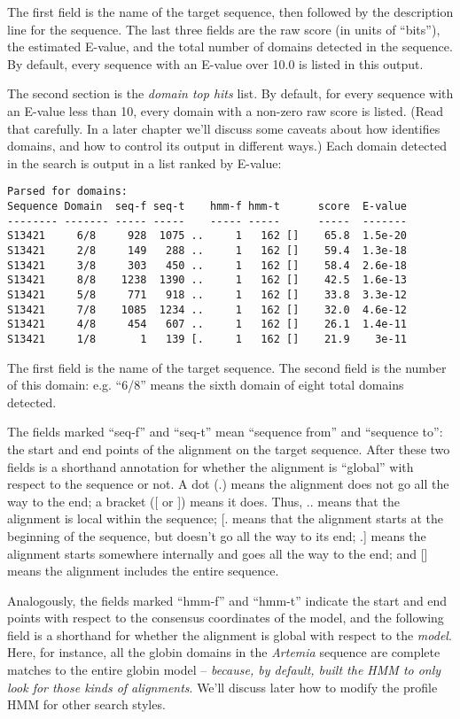 The first field is the name of the target sequence, then followed by
the description line for the sequence. The last three fields are the
raw score (in units of ``bits''), the estimated E-value, and the total
number of domains detected in the sequence.  By default, every
sequence with an E-value over 10.0 is listed in this output.

The second section is the {\em domain top hits} list. By default, for
every sequence with an E-value less than 10, every domain with a
non-zero raw score is listed. (Read that carefully. In a later chapter
we'll discuss some caveats about how  identifies
domains, and how to control its output in different ways.) Each domain
detected in the search is output in a list ranked by E-value:

{\small\begin{verbatim}
Parsed for domains:
Sequence Domain  seq-f seq-t    hmm-f hmm-t      score  E-value
-------- ------- ----- -----    ----- -----      -----  -------
S13421     6/8     928  1075 ..     1   162 []    65.8  1.5e-20
S13421     2/8     149   288 ..     1   162 []    59.4  1.3e-18
S13421     3/8     303   450 ..     1   162 []    58.4  2.6e-18
S13421     8/8    1238  1390 ..     1   162 []    42.5  1.6e-13
S13421     5/8     771   918 ..     1   162 []    33.8  3.3e-12
S13421     7/8    1085  1234 ..     1   162 []    32.0  4.6e-12
S13421     4/8     454   607 ..     1   162 []    26.1  1.4e-11
S13421     1/8       1   139 [.     1   162 []    21.9    3e-11
\end{verbatim}}

The first field is the name of the target sequence. The second field
is the number of this domain: e.g. ``6/8'' means the sixth domain of
eight total domains detected. 

The fields marked ``seq-f'' and ``seq-t'' mean ``sequence from'' and
``sequence to'': the start and end points of the alignment on the
target sequence. After these two fields is a shorthand annotation for
whether the alignment is ``global'' with respect to the sequence or
not. A dot (.) means the alignment does not go all the way to the end;
a bracket ([ or ]) means it does. Thus, .. means that the alignment is
local within the sequence; [. means that the alignment starts at the
beginning of the sequence, but doesn't go all the way to its end; .]
means the alignment starts somewhere internally and goes all the way
to the end; and [] means the alignment includes the entire sequence.

Analogously, the fields marked ``hmm-f'' and ``hmm-t'' indicate the
start and end points with respect to the consensus coordinates of the
model, and the following field is a shorthand for whether the
alignment is global with respect to the {\em model}. Here, for
instance, all the globin domains in the {\em Artemia} sequence are
complete matches to the entire globin model -- {\em because, by
default,  built the HMM to only look for those kinds of
alignments}. We'll discuss later how to modify the profile HMM for
other search styles.

